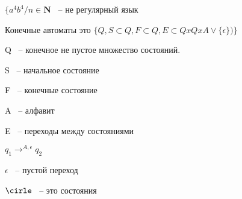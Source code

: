 \documentclass[russian]{lecture-notes}
\begin{document}
	$\{a^{4}b^{4}/n \in \mathbf{N}$ ~-- не регулярный язык

	\begin{definition}

		Конечные автоматы это $\{ Q,S \subset Q, F \subset Q, E \subset Q x Q x A \lor \{\epsilon\}) \}$

		Q ~-- конечное не пустое множество состояний.

		S ~-- начальное состояние

		F ~-- конечные состояние

		A ~-- алфавит

		E ~-- переходы между состояниями

		$q_{1} \rightarrow^{A,\epsilon } q_{2}$

		\end{definition}

	$\epsilon $ ~-- пустой переход

	$\cirle $ ~-- это состояния
\end{document}
